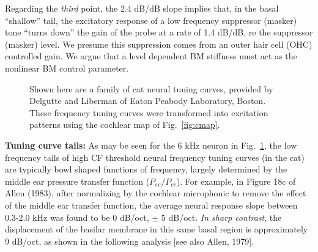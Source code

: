 \documentclass{ws-p8-50x6-00}
\newcommand{\Fig}[1]{Fig.~\ref{fig:#1}}
\newcommand{\paragraph}[1]{{\bf #1}}
\begin{document}
Regarding the \emph{third} point, the 2.4 dB/dB slope implies that, in the
basal ``shallow'' tail, the excitatory response of a low frequency suppressor
(masker) tone ``turns down'' the gain of the probe at a rate of 1.4
dB/dB, re the suppressor (masker) level.
We presume this suppression comes from an outer hair cell (OHC) controlled
gain.  We argue that a level dependent BM stiffness must act as the nonlinear
BM control parameter.

\begin{figure}[ht]
\begin{minipage}[b]{2.75in}
 \centering
\end{minipage}
\hfill
\parbox[b]{1.75in}{
\caption{ \small \setlength{\baselineskip}{.1em}
Shown here are a family of cat neural tuning curves, provided by Delgutte
and Liberman of Eaton Peabody Laboratory, Boston. These frequency tuning
curves were transformed into excitation patterns using the cochlear map of
\Fig{cmap}.
\label{fig:eplftc}
	}}
\end{figure}

\paragraph{Tuning curve tails:}
As may be seen for the 6 kHz neuron in \Fig{eplftc}, the low frequency tails
of high CF threshold neural frequency tuning curves (in the cat)
are typically bowl shaped functions of frequency, largely determined by
the middle ear pressure transfer function ($P_{sv}/P_{ec}$).
For example, in Figure 18c of Allen (1983), \nocite{Allen83a} after
normalizing by the cochlear microphonic to remove the effect of the
middle ear transfer function, the average neural response slope between
0.3-2.0 kHz was found to be 0 dB/oct, $\pm$ 5 dB/oct.
\emph{In sharp contrast}, the displacement of the basilar membrane in this same
basal region is approximately 9 dB/oct, as shown in the following analysis
[see also Allen, 1979]. \nocite{Allen79a,Allen83a}
\end{document}
